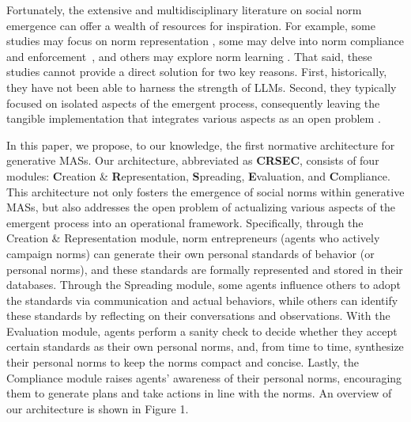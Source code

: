 \documentclass{article}
\begin{document}
Fortunately, 
the extensive and multidisciplinary literature on social norm emergence can offer a wealth of resources for inspiration.
For example, some studies may focus on norm representation \cite{dignum1999autonomous,aagotnes2009temporal}, some may delve into norm compliance and enforcement~\cite{modgil2009framework,villatoro2011dynamic,mahmoud2015establishing,tzeng2024norm}, and others may explore norm learning \cite{sen2007emergence,beheshti2015cognitive,hu2017achieving,hu2019big}.
That said, these studies cannot provide a direct solution for two key reasons. First, historically, they have not been able to harness the strength of LLMs. Second, they typically focused on isolated aspects of the emergent process, consequently leaving the tangible implementation that integrates various aspects as an open problem \cite{savarimuthu2011norm,haynes2017engineering}.

In this paper, we propose, to our knowledge, the first normative architecture for generative MASs.
Our architecture, abbreviated as \textbf{CRSEC}, consists of four modules: \textbf{C}reation \& \textbf{R}epresentation, \textbf{S}preading, \textbf{E}valuation, and \textbf{C}ompliance.
This architecture not only fosters the emergence of social norms within generative MASs, but also addresses the open problem of actualizing various aspects of the emergent process into an operational framework. 
Specifically, through the Creation \& Representation module, norm entrepreneurs (agents who actively campaign norms) can generate their own personal standards of behavior (or personal norms), and these standards are formally represented and stored in their databases.
Through the Spreading module, some agents influence others to adopt the standards via communication and actual behaviors, while others can identify these standards by reflecting on their conversations and observations. 
With the Evaluation module, agents perform a sanity check to decide whether they accept certain standards as their own personal norms, and, from time to time, synthesize their personal norms to keep the norms compact and concise. 
Lastly, the Compliance module raises agents' awareness of their personal norms, encouraging them to generate plans and take actions in line with the norms. An overview of our architecture is shown in Figure 1.
\end{document}
